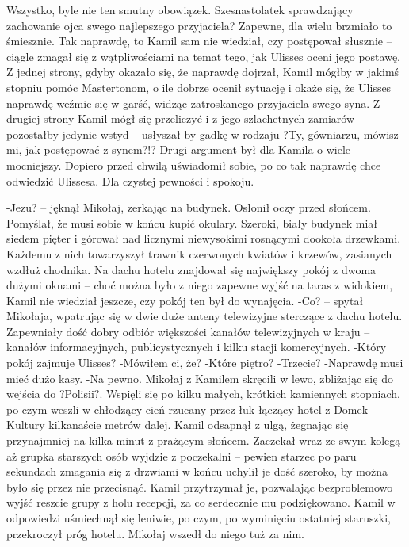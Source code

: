 \documentclass[../MAIN.tex]{subfiles}
\begin{document}
Wszystko, byle nie ten smutny obowiązek.
Szesnastolatek sprawdzający zachowanie ojca swego najlepszego przyjaciela? Zapewne, dla wielu brzmiało to śmiesznie. Tak naprawdę, to Kamil sam nie wiedział, czy postępował słusznie -- ciągle zmagał się z wątpliwościami na temat tego, jak Ulisses oceni jego postawę.
Z jednej strony, gdyby okazało się, że naprawdę dojrzał, Kamil mógłby w jakimś stopniu pomóc Mastertonom, o ile dobrze ocenił sytuację i okaże się, że Ulisses naprawdę weźmie się w garść, widząc zatroskanego przyjaciela swego syna.
Z drugiej strony Kamil mógł się przeliczyć i z jego szlachetnych zamiarów pozostałby jedynie wstyd -- usłyszał by gadkę w rodzaju ?Ty, gówniarzu, mówisz mi, jak postępować z synem?!?
Drugi argument był dla Kamila o wiele mocniejszy. Dopiero przed chwilą uświadomił sobie, po co tak naprawdę chce odwiedzić Ulissesa.
Dla czystej pewności i spokoju.

-Jezu? -- jęknął Mikołaj, zerkając na budynek. Osłonił oczy przed słońcem. Pomyślał, że musi sobie w końcu kupić okulary.
Szeroki, biały budynek miał siedem pięter i górował nad licznymi niewysokimi rosnącymi dookoła drzewkami. Każdemu z nich towarzyszył trawnik czerwonych kwiatów i krzewów, zasianych wzdłuż chodnika.
Na dachu hotelu znajdował się największy pokój z dwoma dużymi oknami -- choć można było z niego zapewne wyjść na taras z widokiem, Kamil nie wiedział jeszcze, czy pokój ten był do wynajęcia.
-Co? -- spytał Mikołaja, wpatrując się w dwie duże anteny telewizyjne sterczące z dachu hotelu. Zapewniały dość dobry odbiór większości kanałów telewizyjnych w kraju -- kanałów informacyjnych, publicystycznych i kilku stacji komercyjnych.
-Który pokój zajmuje Ulisses?
-Mówiłem ci, że?
-Które piętro?
-Trzecie?
-Naprawdę musi mieć dużo kasy.
-Na pewno.
Mikołaj z Kamilem skręcili w lewo, zbliżając się do wejścia do ?Polisii?. Wspięli się po kilku małych, krótkich kamiennych stopniach, po czym weszli w chłodzący cień rzucany przez łuk łączący hotel z Domek Kultury kilkanaście metrów dalej. Kamil odsapnął z ulgą, żegnając się przynajmniej na kilka minut z prażącym słońcem. Zaczekał wraz ze swym kolegą aż grupka starszych osób wyjdzie z poczekalni -- pewien starzec po paru sekundach zmagania się z drzwiami w końcu uchylił je dość szeroko, by można było się przez nie przecisnąć.
Kamil przytrzymał je, pozwalając bezproblemowo wyjść reszcie grupy z holu recepcji, za co serdecznie mu podziękowano. Kamil w odpowiedzi uśmiechnął się leniwie, po czym, po wyminięciu ostatniej staruszki, przekroczył próg hotelu. Mikołaj wszedł do niego tuż za nim.
\end{document}
